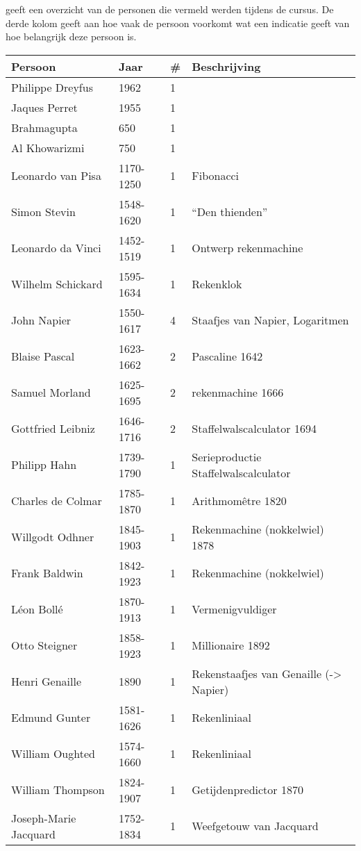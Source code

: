 \documentclass[../main.tex]{subfiles}
\begin{document}
 geeft een overzicht van de personen die vermeld werden tijdens de cursus. De derde kolom geeft aan hoe vaak de persoon voorkomt wat een indicatie geeft van hoe belangrijk deze persoon is.

\begin{longtable}{llll}
\toprule
Persoon	& Jaar	& \#	& Beschrijving \\
\midrule
\endhead
Philippe Dreyfus		&	1962		&	1		&	\\
Jaques Perret			&	1955		&	1		&	\\
Brahmagupta				&	650			&	1		&	\\
Al Khowarizmi			&	750			&	1		&	\\
Leonardo van Pisa		&	1170-1250	&	1		&	Fibonacci	\\
Simon Stevin			&	1548-1620	&	1		&	``Den thienden''	\\
Leonardo da Vinci		&	1452-1519	&	1		&	Ontwerp rekenmachine	\\
Wilhelm Schickard		&	1595-1634	&	1		&	Rekenklok	\\
John Napier				&	1550-1617	&	4		&	Staafjes van Napier, Logaritmen	\\
Blaise Pascal			&	1623-1662	&	2		&	Pascaline 1642	\\
Samuel Morland			&	1625-1695	&	2		&	rekenmachine 1666	\\
Gottfried Leibniz		&	1646-1716	&	2		&	Staffelwalscalculator 1694	\\
Philipp Hahn			&	1739-1790	&	1		&	Serieproductie Staffelwalscalculator	\\
Charles de Colmar		&	1785-1870	&	1		&	Arithmomêtre 1820	\\
Willgodt Odhner			&	1845-1903	&	1		&	Rekenmachine (nokkelwiel) 1878	\\
Frank Baldwin			&	1842-1923	&	1		&	Rekenmachine (nokkelwiel)	\\
Léon Bollé				&	1870-1913	&	1		&	Vermenigvuldiger	\\
Otto Steigner			&	1858-1923	&	1		&	Millionaire 1892	\\
Henri Genaille			&	1890		&	1		&	Rekenstaafjes van Genaille (-> Napier)	\\
Edmund Gunter			&	1581-1626	&	1		&	Rekenliniaal	\\
William Oughted			&	1574-1660	&	1		&	Rekenliniaal	\\
William Thompson		&	1824-1907	&	1		&	Getijdenpredictor 1870	\\
Joseph-Marie Jacquard	&	1752-1834	&	1		&	Weefgetouw van Jacquard	\\

\end{longtable}
\end{document}
